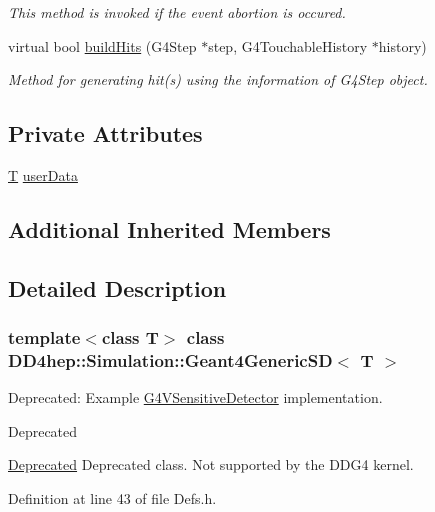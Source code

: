 \begin{DoxyCompactItemize}
\begin{DoxyCompactList}\small\item\em This method is invoked if the event abortion is occured. \end{DoxyCompactList}\item 
virtual bool \hyperlink{class_d_d4hep_1_1_simulation_1_1_geant4_generic_s_d_a72d6c9cb683b9a0bd58fdbd17dc94be6}{build\+Hits} (G4\+Step $\ast$step, G4\+Touchable\+History $\ast$history)
\begin{DoxyCompactList}\small\item\em Method for generating hit(s) using the information of G4\+Step object. \end{DoxyCompactList}\end{DoxyCompactItemize}
\subsection*{Private Attributes}
\begin{DoxyCompactItemize}
\item 
\hyperlink{class_t}{T} \hyperlink{class_d_d4hep_1_1_simulation_1_1_geant4_generic_s_d_a95379cb6ef1953981bd7f12039299e47}{user\+Data}
\end{DoxyCompactItemize}
\subsection*{Additional Inherited Members}


\subsection{Detailed Description}
\subsubsection*{template$<$class T$>$\newline
class D\+D4hep\+::\+Simulation\+::\+Geant4\+Generic\+S\+D$<$ T $>$}

Deprecated\+: Example \hyperlink{class_g4_v_sensitive_detector}{G4\+V\+Sensitive\+Detector} implementation. 

\begin{DoxyRefDesc}{Deprecated}
\item[\hyperlink{deprecated__deprecated000007}{Deprecated}]Deprecated class. Not supported by the D\+D\+G4 kernel. \end{DoxyRefDesc}


Definition at line 43 of file Defs.\+h.




